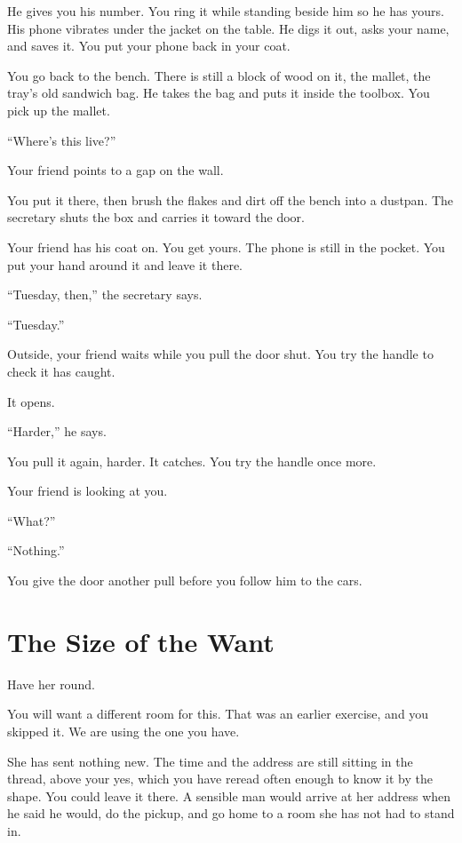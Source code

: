\documentclass[11pt,oneside]{book}
\begin{document}
He gives you his number. You ring it while standing beside him so he has yours. His phone vibrates under the jacket on the table. He digs it out, asks your name, and saves it. You put your phone back in your coat.

You go back to the bench. There is still a block of wood on it, the mallet, the tray's old sandwich bag. He takes the bag and puts it inside the toolbox. You pick up the mallet.

``Where's this live?''

Your friend points to a gap on the wall.

You put it there, then brush the flakes and dirt off the bench into a dustpan. The secretary shuts the box and carries it toward the door.

Your friend has his coat on. You get yours. The phone is still in the pocket. You put your hand around it and leave it there.

``Tuesday, then,'' the secretary says.

``Tuesday.''

Outside, your friend waits while you pull the door shut. You try the handle to check it has caught.

It opens.

``Harder,'' he says.

You pull it again, harder. It catches. You try the handle once more.

Your friend is looking at you.

``What?''

``Nothing.''

You give the door another pull before you follow him to the cars.

\chapter*{The Size of the Want}

Have her round.

You will want a different room for this. That was an earlier exercise, and you skipped it. We are using the one you have.

She has sent nothing new. The time and the address are still sitting in the thread, above your yes, which you have reread often enough to know it by the shape. You could leave it there. A sensible man would arrive at her address when he said he would, do the pickup, and go home to a room she has not had to stand in.
\end{document}

